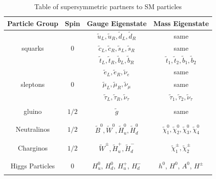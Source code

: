 \begin{table}[H]
\begin{center}
\begin{tabular}{ c c c c }
\toprule
Particle Group    & Spin     & Gauge Eigenstate     & Mass Eigenstate \\
\midrule 
\vspace{3mm}
        &         & $\tilde{u}_{L}, \tilde{u}_{R}, \tilde{d}_{L}, \tilde{d}_{R}$    & same    \\
\vspace{3mm}
squarks     & $0$    & $\tilde{c}_{L}, \tilde{c}_{R}, \tilde{s}_{L}, \tilde{s}_{R}$    & same    \\
\vspace{3mm}
        &         & $\tilde{t}_{L}, \tilde{t}_{R}, \tilde{b}_{L}, \tilde{b}_{R}$    & $\tilde{t}_{1}, \tilde{t}_{2}, \tilde{b}_{1}, \tilde{b}_{2}$    \\

\hline 

\vspace{3mm}
        &         & $\tilde{e}_{L}, \tilde{e}_{R}, \tilde{\nu}_{e}$        & same    \\
\vspace{3mm}
sleptons     & $0$    & $\tilde{\mu}_{L}, \tilde{\mu}_{R}, \tilde{\nu}_{\mu}$    & same    \\
\vspace{3mm}
        &         & $\tilde{\tau}_{L}, \tilde{\tau}_{R}, \tilde{\nu}_{\tau}$    & $\tilde{\tau}_{1}, \tilde{\tau}_{2}, \tilde{\nu}_{\tau}$    \\    
        
\hline \\

gluino    & $1/2$    & $\tilde{g}$    &    same \\
\\
\hline \\

Neutralinos    & $1/2$    & $\tilde{B}^{0}, \tilde{W}^{0}, \tilde{H}^{0}_{u}, \tilde{H}^{0}_{d}$& $\tilde{\chi}^{0}_{1}, \tilde{\chi}^{0}_{2}, \tilde{\chi}^{0}_{3}, \tilde{\chi}^{0}_{4}$ \\
\\
\hline \\

Charginos        & $1/2$    & $\tilde{W}^{\pm}, \tilde{H}^{+}_{u}, \tilde{H}^{-}_{d}$& $\tilde{\chi}^{\pm}_{1}, \tilde{\chi}^{\pm}_{2}$ \\
\\
\hline \\
Higgs Particles    &    0    & $H_{u}^{0}$, $H_{d}^{0}$, $H_{u}^{+}$, $H_{d}^{-}$ & $h^{0}$, $H^{0}$, $A^{0}$, $H^{\pm}$ \\
\\
\bottomrule
\end{tabular}
\caption{Table of supersymmetric partners to SM particles}
\label{tab:MSSMParticles}
\end{center}
\end{table}

